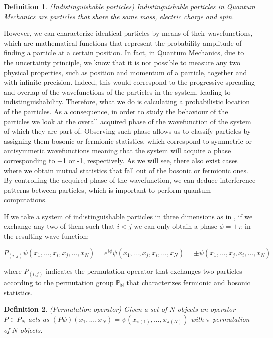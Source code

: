 \documentclass{Configuration_Files/PoliMi3i_thesis}
\newtheorem{definition}{Definition}[chapter]
\begin{document}
\begin{definition}(Indistinguishable particles)
	Indistinguishable particles in Quantum Mechanics are particles that share the same mass, electric charge and spin.
\end{definition}

However, we can characterize identical particles by means of their wavefunctions, which are mathematical functions that represent the probability amplitude of finding a particle at a certain position. 
In fact, in Quantum Mechanics, due to the uncertainty principle, we know that it is not possible to measure any two physical properties, such as position and momentum of a particle, together and with infinite precision. Indeed, this would correspond to the progressive spreading and overlap of the wavefunctions of the particles in the system, leading to indistinguishability.
Therefore, what we do is calculating a probabilistic location of the particles. As a consequence, in order to study the behaviour of the particles we look at the overall acquired phase of the wavefunction of the system of which they are part of. Observing such phase allows us to classify particles by assigning them bosonic or fermionic statistics, which correspond to symmetric or antisymmetic wavefunctions meaning that the system will acquire a phase corresponding to +1 or -1, respectively. As we will see, there also exist cases where we obtain mutual statistics that fall out of the bosonic or fermionic ones. By controlling the acquired phase of the wavefunction, we can deduce interference patterns between particles, which is important to perform quantum computations. \newline

If we take a system of indistinguishable particles in three dimensions as in \cite{Cor23}, if we exchange any two of them such that $i<j$ we can only obtain a phase $\phi=\pm \pi$ in the resulting wave function:  

\begin{center}	
	$P_{(i,j)}\psi(x_1, ..., x_i,x_j, ..., x_N)=e^{i\phi} \psi(x_1, ..., x_j,x_i, ..., x_N)=\pm \psi(x_1, ..., x_j,x_i, ..., x_N)$
\end{center}

where $P_{(i,j)}$ indicates the permutation operator that exchanges two particles according to the permutation group $\mathbb{P_N}$ that characterizes fermionic and bosonic statistics. 

\begin{definition}(Permutation operator)
	Given a set of $N$ objects an operator $P \in P_N$ acts as $(P \psi)(x_1,...,x_N)=\psi(x_{\pi(1)}, ..., x_{\pi(N)})$ with $\pi$ permutation of $N$ objects.
\end{definition}
\end{document}
